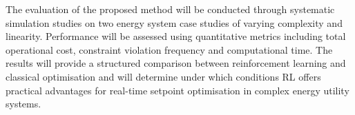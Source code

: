\vspace{0.5pt}
\par
The evaluation of the proposed method will be conducted through systematic simulation studies on two energy system case studies of varying complexity and linearity. Performance will be assessed using quantitative metrics including total operational cost, constraint violation frequency and computational time. The results will provide a structured comparison between reinforcement learning and classical optimisation and will determine under which conditions RL offers practical advantages for real-time setpoint optimisation in complex energy utility systems. 
